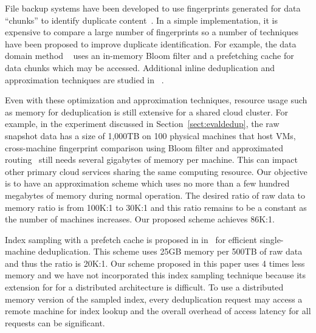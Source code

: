 File backup systems have been developed to use fingerprints generated for
data ``chunks''  to identify duplicate
content~\cite{venti02,Rhea2008}.  In a simple implementation,
it is expensive to compare a large number of 
fingerprints
so a number of techniques have been proposed to improve duplicate identification. 
For example, the data domain method ~\cite{bottleneck08} 
uses  an in-memory Bloom filter and a prefetching cache for data chunks 
which may be accessed.  
Additional inline deduplication and  approximation techniques
are studied in ~\cite{extreme_binning09,sparseindex09,Srinivasan2012,WeiZhangIEEE}.  

Even with these optimization and approximation techniques, resource usage such as memory  for deduplication
is still extensive for a shared cloud cluster.  
For example, in the experiment discussed in Section~\ref{sect:evaldedup}, 
the raw snapshot data has a size of 1,000TB on 100 physical machines that host VMs,
cross-machine fingerprint comparison using Bloom filter and approximated routing~\cite{bottleneck08,Dong2011} 
still needs several gigabytes of memory per machine. This can impact other primary cloud services sharing the same
computing resource. Our objective is to have an approximation scheme 
which uses no more than a few hundred megabytes of memory during normal operation.
The desired ratio of raw data to memory ratio is from 100K:1 to 30K:1 
and this ratio remains to be a constant as the number of machines increases.
Our proposed scheme achieves 86K:1.

Index sampling with a prefetch cache  is proposed in
in~\cite{Guo2011} for efficient single-machine deduplication. 
This scheme uses 25GB memory per 500TB of raw data
and thus the ratio is 20K:1. Our scheme proposed in this paper 
uses 4 times less memory and we have not incorporated this index 
sampling technique because its extension for
for a distributed architecture is difficult.  To use a distributed memory version 
of the sampled index, every deduplication
request may access a remote machine for index lookup and the overall overhead 
of access latency for all requests can be significant.


